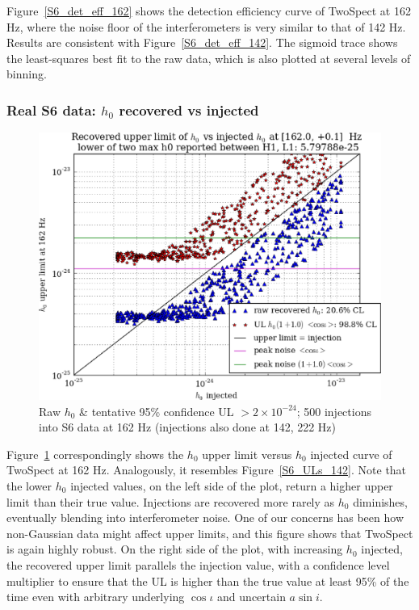 Figure~\ref{S6_det_eff_162} shows the detection efficiency curve of TwoSpect at 162 Hz, where the noise floor of the interferometers is very similar to that of 142 Hz. 
Results are consistent with Figure~\ref{S6_det_eff_142}.
The sigmoid trace shows the least-squares best fit to the raw data, which is also plotted at several levels of binning.

\subsubsection{Real S6 data: $h_0$ recovered vs injected}

\begin{figure}
\begin{center}
\includegraphics[width=0.70\paperwidth,height=0.48\paperheight]{plots/h0UL-vs-h0injected-162-0Hz.eps}
\caption{
Raw $h_0$ \& tentative 95\% confidence UL $>2\times10^{-24}$; 500 injections
into S6 data at 162 Hz (injections also done at 142, 222 Hz)}
\label{S6_ULs_162}
\end{center}
\end{figure}


Figure~\ref{S6_ULs_162} correspondingly shows the $h_0$ upper limit versus $h_0$ injected curve of TwoSpect at 162 Hz.
Analogously, it resembles Figure~\ref{S6_ULs_142}.
Note that the lower $h_0$ injected values, on the left side of the plot, return a higher upper limit than their true value.
Injections are recovered more rarely as $h_0$ diminishes, eventually blending into interferometer noise.
One of our concerns has been how non-Gaussian data might affect upper limits, and this figure shows that TwoSpect is again highly robust.
On the right side of the plot, with increasing $h_0$ injected, the recovered upper limit parallels the injection value, with a confidence level multiplier to ensure that the UL is higher than the true value at least 95\% of the time even with arbitrary underlying $\cos \iota$ and uncertain $a \sin i$.


